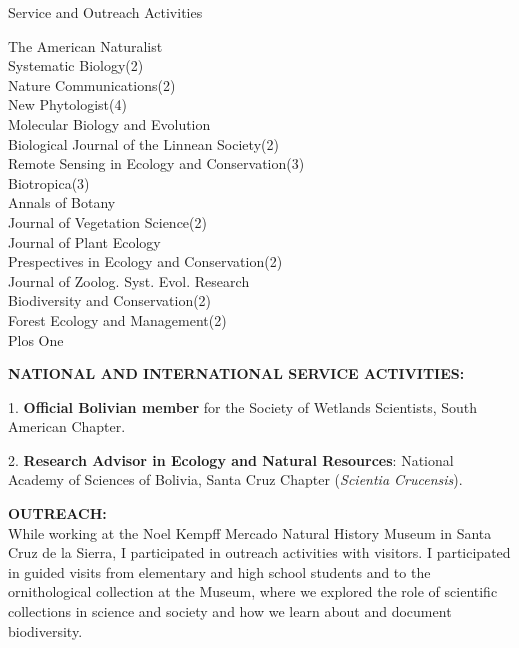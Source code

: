 \documentclass{resume} %
\begin{document}
\begin{rSection}{Service and Outreach Activities}
\begin{multicols}{2}
The American Naturalist \\ 
Systematic Biology(2) \\
Nature Communications(2) \\
New Phytologist(4) \\ 
Molecular Biology and Evolution \\ 
Biological Journal of the Linnean Society(2) \\
Remote Sensing in Ecology and Conservation(3) \\ 
Biotropica(3) \\ 
Annals of Botany \\ 
Journal of Vegetation Science(2) \\ 
Journal of Plant Ecology \\ 
Prespectives in Ecology and Conservation(2) \\
Journal of Zoolog. Syst. Evol. Research \\
Biodiversity and Conservation(2) \\
Forest Ecology and Management(2) \\
Plos One \smallskip

\end{multicols}

\textbf{NATIONAL AND INTERNATIONAL SERVICE ACTIVITIES:} \smallskip 

\item 1. \textbf{Official Bolivian member} for the Society of Wetlands Scientists, South American Chapter. 

\item 2. \textbf{Research Advisor in Ecology and Natural Resources}: National Academy of Sciences of Bolivia, Santa Cruz Chapter ({\em Scientia Crucensis}). 

\textbf{OUTREACH:} \smallskip \\ 
While working at the Noel Kempff Mercado Natural History Museum in Santa Cruz de la Sierra, I participated in outreach activities with visitors. I participated in guided visits from elementary and high school students and to the ornithological collection at the Museum, where we explored the role of scientific collections in science and society and how we learn about and document biodiversity.


\end{rSection}
\end{document}
